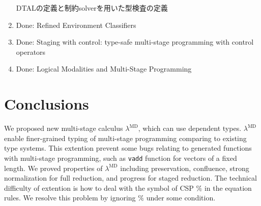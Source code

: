 \documentclass[runningheads]{llncs}
\newcommand{\red}[1]{\textcolor{red}{#1 }}
\newcommand{\LMD}{$\lambda^{\textrm{MD}}$\xspace}
\begin{document}
\begin{enumerate}
										      DTALの定義と制約solverを用いた型検査の定義
										\item Done: Refined Environment Classifiers\cite{kiselyov2016refined}
										\item Done: Staging with control: type-safe multi-stage programming with control operators\cite{oishi2017staging}
										\item Done: Logical Modalities and Multi-Stage Programming\cite{benaissa1999logical}
									\end{enumerate}
									
									\section{Conclusions}
									
									We proposed new multi-stage calculus \LMD, which can use dependent types.
									\LMD enable finer-grained typing of multi-stage programming comparing to existing type systems.
									This extention prevent some bugs relating to generated functions with multi-stage programming,
									such as \verb|vadd| function for vectors of a fixed length.
									We proved properties of \LMD including preservation, confluence, 
									strong normalization for full reduction, and progress for staged reduction.
									The technical difficulty of extention is how to deal with the symbol of CSP $\%$ in the equation rules.
									We resolve this problem by ignoring $\%$ under some condition.
									
\end{document}
